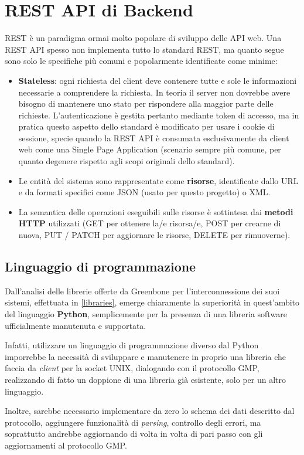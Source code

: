 \section{REST API di Backend}
REST è un paradigma ormai molto popolare di sviluppo delle API web. Una REST API spesso non implementa tutto lo standard REST, ma quanto segue sono solo le specifiche più comuni e popolarmente identificate come minime:
\begin{itemize}
    \item \textbf{Stateless}: ogni richiesta del client deve contenere tutte e sole le informazioni necessarie a comprendere la richiesta. In teoria il server non dovrebbe avere bisogno di mantenere uno stato per rispondere alla maggior parte delle richieste. L'autenticazione è gestita pertanto mediante token di accesso, ma in pratica questo aspetto dello standard è modificato per usare i cookie di sessione, specie quando la REST API è consumata esclusivamente da client web come una Single Page Application (scenario sempre più comune, per quanto degenere rispetto agli scopi originali dello standard).
    \item Le entità del sistema sono rappresentate come \textbf{risorse}, identificate dallo URL e da formati specifici come JSON (usato per questo progetto) o XML.
    \item La semantica delle operazioni eseguibili sulle risorse è sottintesa dai \textbf{metodi HTTP} utilizzati (GET per ottenere la/e risorsa/e, POST per crearne di nuova, PUT / PATCH per aggiornare le risorse, DELETE per rimuoverne).
\end{itemize}

\subsection{Linguaggio di programmazione}
Dall'analisi delle librerie offerte da Greenbone per l'interconnessione dei suoi sistemi, effettuata in \ref{libraries}, emerge chiaramente la superiorità in quest'ambito del linguaggio \textbf{Python}, semplicemente per la presenza di una libreria software ufficialmente manutenuta e supportata.

Infatti, utilizzare un linguaggio di programmazione diverso dal Python imporrebbe la necessità di sviluppare e manutenere in proprio una libreria che faccia da \emph{client} per la socket UNIX, dialogando con il protocollo GMP, realizzando di fatto un doppione di una libreria già esistente, solo per un altro linguaggio.

Inoltre, sarebbe necessario implementare da zero lo schema dei dati descritto dal protocollo, aggiungere funzionalità di \emph{parsing}, controllo degli errori, ma soprattutto andrebbe aggiornando di volta in volta di pari passo con gli aggiornamenti al protocollo GMP.

